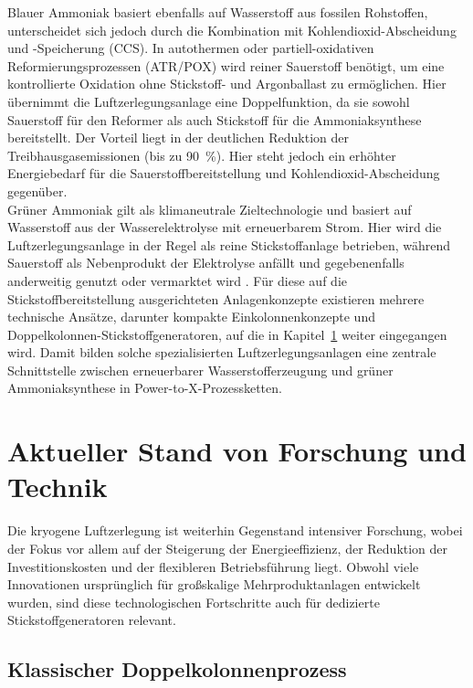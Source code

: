 Blauer Ammoniak basiert ebenfalls auf Wasserstoff aus fossilen Rohstoffen, unterscheidet sich jedoch durch die Kombination mit Kohlendioxid-Abscheidung und -Speicherung (CCS). In autothermen oder partiell-oxidativen Reformierungsprozessen (ATR/POX) wird reiner Sauerstoff benötigt, um eine kontrollierte Oxidation ohne Stickstoff- und Argonballast zu ermöglichen. Hier übernimmt die Luftzerlegungsanlage eine Doppelfunktion, da sie sowohl Sauerstoff für den Reformer als auch Stickstoff für die Ammoniaksynthese bereitstellt. Der Vorteil liegt in der deutlichen Reduktion der Treibhausgasemissionen (bis zu \SI{90}{\percent}). Hier steht jedoch ein erhöhter Energiebedarf für die Sauerstoffbereitstellung und Kohlendioxid-Abscheidung gegenüber. \cite{applAmmonia1Introduction2011, humphreysDevelopmentRecentProgress2021, smithReviewAirSeparation2001}\\
Grüner Ammoniak gilt als klimaneutrale Zieltechnologie und basiert auf Wasserstoff aus der Wasserelektrolyse mit erneuerbarem Strom. Hier wird die Luftzerlegungsanlage in der Regel als reine Stickstoffanlage betrieben, während Sauerstoff als Nebenprodukt der Elektrolyse anfällt und gegebenenfalls anderweitig genutzt oder vermarktet wird \cite{applAmmonia1Introduction2011, humphreysDevelopmentRecentProgress2021}. Für diese auf die Stickstoffbereitstellung ausgerichteten Anlagenkonzepte existieren mehrere technische Ansätze, darunter kompakte Einkolonnenkonzepte und Doppelkolonnen-Stickstoffgeneratoren, auf die in Kapitel~\ref{sec:grundlagen_forschungsstand} weiter eingegangen wird. Damit bilden solche spezialisierten Luftzerlegungsanlagen eine zentrale Schnittstelle zwischen erneuerbarer Wasserstofferzeugung und grüner Ammoniaksynthese in Power-to-X-Prozessketten. \\

\section{Aktueller Stand von Forschung und Technik}
\label{sec:grundlagen_forschungsstand}

Die kryogene Luftzerlegung ist weiterhin Gegenstand intensiver Forschung, wobei der Fokus vor allem auf der Steigerung der Energieeffizienz, der Reduktion der Investitionskosten und der flexibleren Betriebsführung liegt. Obwohl viele Innovationen ursprünglich für großskalige Mehrproduktanlagen entwickelt wurden, sind diese technologischen Fortschritte auch für dedizierte Stickstoffgeneratoren relevant.

\subsection{Klassischer Doppelkolonnenprozess}
\label{sec:grundlagen_doppelsäule}

